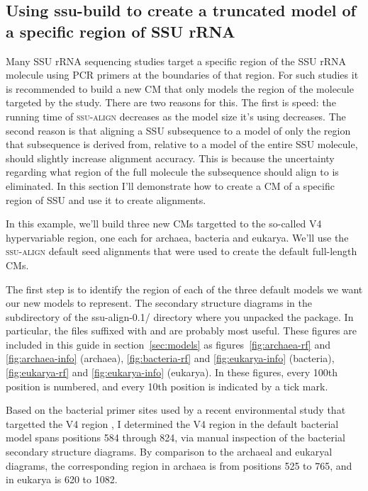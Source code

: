 \subsection{Using ssu-build to create a truncated model of a specific region of SSU rRNA}
\label{sec:tutorial-build-v4}

Many SSU rRNA sequencing studies target a specific region of the SSU
rRNA molecule using PCR primers at the boundaries of that region. For
such studies it is recommended to build a new CM that only models the
region of the molecule targeted by the study. There are two reasons
for this. The first is speed: the running time of \textsc{ssu-align}
decreases as the model size it's using decreases. The second reason is
that aligning a SSU subsequence to a model of only the region that
subsequence is derived from, relative to a model of the entire SSU
molecule, should slightly increase alignment accuracy. This is because
the uncertainty regarding what region of the full molecule the subsequence
should align to is eliminated. In this section I'll demonstrate how to
create a CM of a specific region of SSU and use it to create
alignments. 

In this example, we'll build three new CMs targetted to the so-called
V4 hypervariable region, one each for archaea, bacteria and
eukarya. We'll use the \textsc{ssu-align} default seed alignments that
were used to create the default full-length CMs. 

The first step is to identify the region of each of the three default
models we want our new models to represent. The secondary structure
diagrams in the  subdirectory of the
{ssu-align-0.1/} directory where you unpacked the package.
In particular, the files suffixed with  and
 are probably most useful. These figures are included
in this guide in section~\ref{sec:models} as
figures~\ref{fig:archaea-rf} and \ref{fig:archaea-info} (archaea),
\ref{fig:bacteria-rf} and \ref{fig:eukarya-info} (bacteria),
\ref{fig:eukarya-rf} and \ref{fig:eukarya-info} (eukarya).
In these figures, every 100th position is numbered, and every 10th
position is indicated by a tick mark.

Based on the bacterial primer sites used by a recent environmental
study that targetted the V4 region \cite{Claesson09}, I determined 
the V4 region in the default bacterial model spans positions 584
through 824, via manual inspection of the bacterial secondary structure
diagrams. By comparison to the archaeal and eukaryal diagrams, 
the corresponding region in archaea is from positions 525 to
765, and in eukarya is 620 to 1082. 

